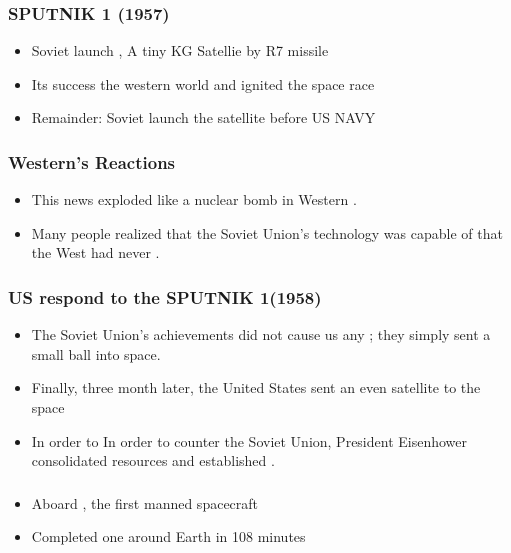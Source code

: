 \documentclass[10pt]{article}
\newcommand{\fillin}[1]{\uline{\hspace{#1}}}
\begin{document}
\subsubsection*{SPUTNIK 1 (1957)}
\begin{itemize}
    \item Soviet launch \fillin{4cm}, A tiny \fillin{2cm} KG Satellie by R7 missile
    \item Its success \fillin{3cm} the western world and \fillin{3cm} ignited the space race
    \item Remainder: Soviet launch the satellite before US NAVY
\end{itemize}

\subsubsection*{Western's Reactions}
\begin{itemize}
    \item This news exploded like a nuclear bomb in Western \fillin{5cm}.
    \item Many people realized that the Soviet Union's technology was capable of \fillin{5cm} that the West had never \fillin{3cm}. 
\end{itemize}

\subsubsection*{US respond to the SPUTNIK 1(1958)}
\begin{itemize}
    \item The Soviet Union's achievements did not cause us any \fillin{3cm}; they simply sent a small ball into space.
    \item Finally, three month later, the United States sent an even \fillin{3cm} satellite to the space 
    \item In order to In order to counter the Soviet Union, President Eisenhower consolidated resources and established \fillin{3cm}.
\end{itemize}

\subsubsection*{\fillin{4cm}}
\begin{itemize}
    \item Aboard \fillin{3cm}, the first manned spacecraft
    \item Completed one \fillin{5cm} around Earth in 108 minutes
\end{itemize}
\end{document}
